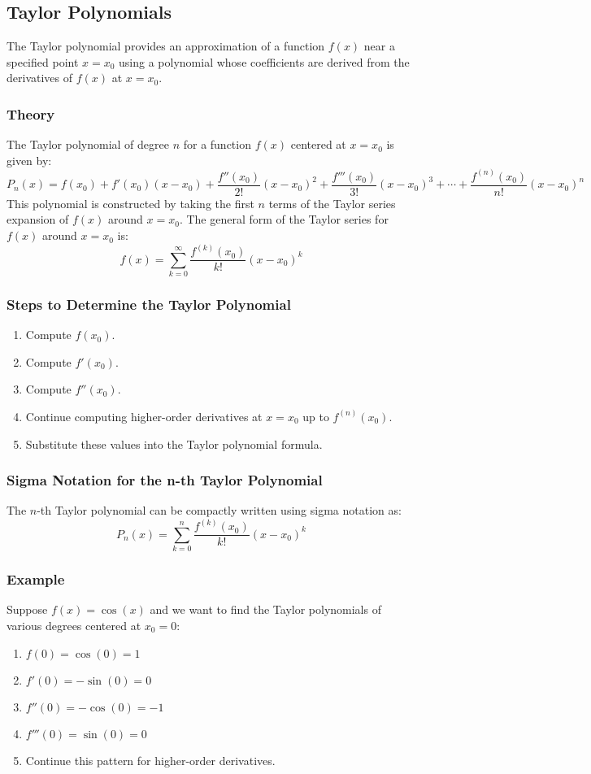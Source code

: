 \documentclass{article}
\begin{document}
\subsection*{Taylor Polynomials}
The Taylor polynomial provides an approximation of a function \( f(x) \) near a specified point \( x = x_0 \) using a polynomial whose coefficients are derived from the derivatives of \( f(x) \) at \( x = x_0 \).

\subsubsection*{Theory}
The Taylor polynomial of degree \( n \) for a function \( f(x) \) centered at \( x = x_0 \) is given by:
\[ P_n(x) = f(x_0) + f'(x_0)(x - x_0) + \frac{f''(x_0)}{2!}(x - x_0)^2 + \frac{f'''(x_0)}{3!}(x - x_0)^3 + \cdots + \frac{f^{(n)}(x_0)}{n!}(x - x_0)^n \]
This polynomial is constructed by taking the first \( n \) terms of the Taylor series expansion of \( f(x) \) around \( x = x_0 \). The general form of the Taylor series for \( f(x) \) around \( x = x_0 \) is:
\[ f(x) = \sum_{k=0}^{\infty} \frac{f^{(k)}(x_0)}{k!} (x - x_0)^k \]

\subsubsection*{Steps to Determine the Taylor Polynomial}
\begin{enumerate}
\item Compute \( f(x_0) \).
\item Compute \( f'(x_0) \).
\item Compute \( f''(x_0) \).
\item Continue computing higher-order derivatives at \( x = x_0 \) up to \( f^{(n)}(x_0) \).
\item Substitute these values into the Taylor polynomial formula.
\end{enumerate}

\subsubsection*{Sigma Notation for the n-th Taylor Polynomial}
The \( n \)-th Taylor polynomial can be compactly written using sigma notation as:
\[ P_n(x) = \sum_{k=0}^{n} \frac{f^{(k)}(x_0)}{k!} (x - x_0)^k \]

\subsubsection*{Example}
Suppose \( f(x) = \cos(x) \) and we want to find the Taylor polynomials of various degrees centered at \( x_0 = 0 \):
\begin{enumerate}
\item \( f(0) = \cos(0) = 1 \)
\item \( f'(0) = -\sin(0) = 0 \)
\item \( f''(0) = -\cos(0) = -1 \)
\item \( f'''(0) = \sin(0) = 0 \)
\item Continue this pattern for higher-order derivatives.
\end{enumerate}
\end{document}
